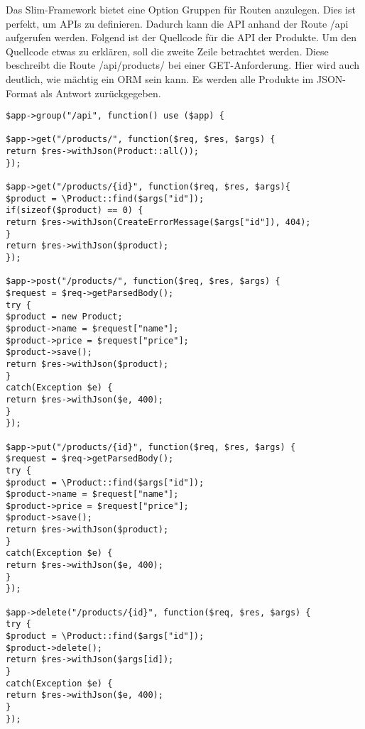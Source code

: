 Das Slim-Framework bietet eine Option Gruppen für Routen anzulegen. Dies ist perfekt, um APIs zu definieren. Dadurch kann die API anhand der Route /api aufgerufen werden. Folgend ist der Quellcode für die API der Produkte. Um den Quellcode etwas zu erklären, soll die zweite Zeile betrachtet werden. Diese beschreibt die Route /api/products/ bei einer GET-Anforderung. Hier wird auch deutlich, wie mächtig ein \ac{ORM} sein kann. Es werden alle Produkte im JSON-Format als Antwort zurückgegeben.
\lstset{language=PHP} 
\begin{lstlisting}[frame=single]
$app->group("/api", function() use ($app) {  

$app->get("/products/", function($req, $res, $args) {
return $res->withJson(Product::all());
});

$app->get("/products/{id}", function($req, $res, $args){
$product = \Product::find($args["id"]);
if(sizeof($product) == 0) {
return $res->withJson(CreateErrorMessage($args["id"]), 404);
}
return $res->withJson($product);
});

$app->post("/products/", function($req, $res, $args) {
$request = $req->getParsedBody();
try {
$product = new Product;
$product->name = $request["name"];
$product->price = $request["price"];
$product->save();
return $res->withJson($product);
}
catch(Exception $e) {
return $res->withJson($e, 400);
}
});

$app->put("/products/{id}", function($req, $res, $args) {
$request = $req->getParsedBody();
try {
$product = \Product::find($args["id"]);
$product->name = $request["name"];
$product->price = $request["price"];
$product->save();
return $res->withJson($product);
}
catch(Exception $e) {
return $res->withJson($e, 400);
}
});

$app->delete("/products/{id}", function($req, $res, $args) {
try {
$product = \Product::find($args["id"]);
$product->delete();
return $res->withJson($args[id]);
}
catch(Exception $e) {
return $res->withJson($e, 400);
}
});
\end{lstlisting}